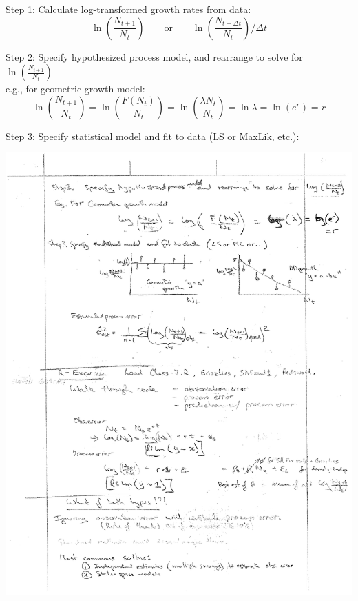 \documentclass{article}
\newcommand{\ind}{\-\hspace{1cm}}
\begin{document}
Step 1: Calculate log-transformed growth rates from data:\\
\begin{equation*}
	\ln \left(\frac{N_{t+1}}{N_t}\right) \quad \quad \text{or} \quad \quad 	\ln\left(\frac{N_{t+\Delta t}}{N_t}\right) \bigg / \Delta t
\end{equation*}

Step 2: Specify hypothesized process model, and rearrange to solve for $\ln \left(\frac{N_{t+1}}{N_t}\right)$\\
\ind e.g., for geometric growth model:\\
\begin{equation*}
	\ln\left(\frac{N_{t+1}}{N_t}\right) = \ln\left(\frac{F(N_t)}{N_t}\right) = \ln\left(\frac{\lambda N_t}{N_t}\right) = \ln \lambda = \ln (e^r) = r
\end{equation*}

Step 3: Specify statistical model and fit to data (LS or MaxLik, etc.):
\begin{center}
	\includegraphics[width=15cm]{figs/image3.pdf}
\end{center}
\end{document}
